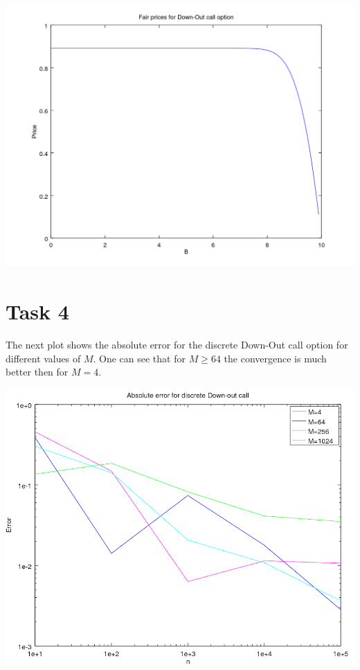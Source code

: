 \documentclass[10pt,a4paper]{article}
\begin{document}
\begin{center}
	\includegraphics[scale=0.5]{images/fair_prices_down_out_call.png}
\end{center}

\section*{Task 4}
The next plot shows the absolute error for the discrete Down-Out call option for different values of $M$. One can see that for $M\geq64$ the convergence is much better then for $M=4$.  

\begin{center}
	\includegraphics[scale=0.55]{images/convergence_plot_discrete_down_out_call.png}
\end{center}
\end{document}
